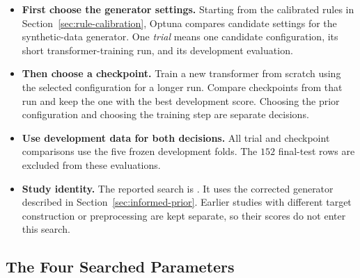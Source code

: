 \documentclass[11pt]{article}
\newenvironment{notes}
  {\begin{itemize}\setlength{\itemsep}{0.45em}\setlength{\parsep}{0pt}}
  {\end{itemize}}
\begin{document}
\begin{notes}
    \item \textbf{First choose the generator settings.}
    Starting from the calibrated rules in
    Section~\ref{sec:rule-calibration}, Optuna compares
    candidate settings for the synthetic-data generator.
    One \emph{trial} means one candidate configuration,
    its short transformer-training run, and its development
    evaluation.

    \item \textbf{Then choose a checkpoint.}
    Train a new transformer from scratch using the selected
    configuration for a longer run. Compare checkpoints
    from that run and keep the one with the best development
    score. Choosing the prior configuration and choosing the
    training step are separate decisions.

    \item \textbf{Use development data for both decisions.}
    All trial and checkpoint comparisons use the five frozen
    development folds. The \(152\) final-test rows are
    excluded from these evaluations.

    \item \textbf{Study identity.}
    The reported search is
    .
    It uses the corrected generator described in
    Section~\ref{sec:informed-prior}. Earlier studies with
    different target construction or preprocessing are kept
    separate, so their scores do not enter this search.
\end{notes}

\subsection{The Four Searched Parameters}
\label{sec:prior-search-space}
\end{document}
